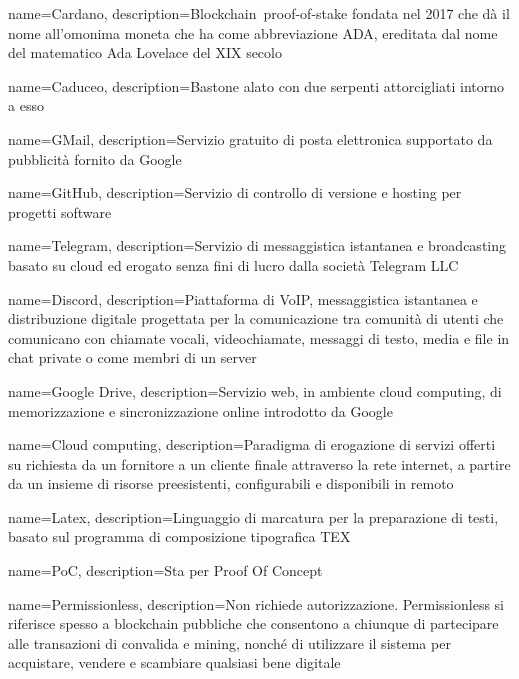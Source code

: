 {
	name={Cardano},
	description={Blockchain\glo\ proof-of-stake fondata nel 2017 che dà il nome all’omonima moneta che ha come abbreviazione ADA, ereditata dal nome del matematico Ada Lovelace del XIX secolo}
}

{
	name={Caduceo},
	description={Bastone alato con due serpenti attorcigliati intorno a esso}
}

{
	name={GMail},
	description={Servizio gratuito di posta elettronica supportato da pubblicità fornito da Google}
}

{
	name={GitHub},
	description={Servizio di controllo di versione e hosting per progetti software}
}

{
	name={Telegram},
	description={Servizio di messaggistica istantanea e broadcasting basato su cloud ed erogato senza fini di lucro dalla società Telegram LLC}
}

{
	name={Discord},
	description={Piattaforma di VoIP, messaggistica istantanea e distribuzione digitale progettata per la comunicazione tra comunità di utenti che comunicano con chiamate vocali, videochiamate, messaggi di testo, media e file in chat private o come membri di un server}
}

{
	name={Google Drive},
	description={Servizio web, in ambiente cloud computing\glo, di memorizzazione e sincronizzazione online introdotto da Google}
}

{
	name={Cloud computing},
	description={Paradigma di erogazione di servizi offerti su richiesta da un fornitore a un cliente finale attraverso la rete internet, a partire da un insieme di risorse preesistenti, configurabili e disponibili in remoto}
}

{
	name={Latex},
	description={Linguaggio di marcatura per la preparazione di testi, basato sul programma di composizione tipografica TEX}
}

{
	name={PoC},
	description={Sta per Proof Of Concept\glo}
}

{
	name={Permissionless},
	description={Non richiede autorizzazione. Permissionless si riferisce spesso a blockchain pubbliche che consentono a chiunque di partecipare alle transazioni di convalida e mining, nonché di utilizzare il sistema per acquistare, vendere e scambiare qualsiasi bene digitale}
}

